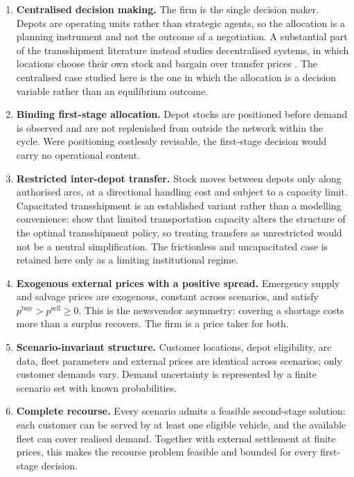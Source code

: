 \documentclass[authoryear,final,3p,times]{elsarticle}
\theoremstyle{definition}
\theoremstyle{plain}
\begin{document}
\begin{enumerate}[label=(A\arabic*),leftmargin=*]
\item \textbf{Centralised decision making.} The firm is the single decision
maker.  Depots are operating units rather than strategic agents, so the
allocation is a planning instrument and not the outcome of a negotiation.  A
substantial part of the transshipment literature instead studies decentralised
systems, in which locations choose their own stock and bargain over transfer
prices \citep{paterson2011lateral}.  The centralised case studied here is the
one in which the allocation is a decision variable rather than an equilibrium
outcome.

\item \textbf{Binding first-stage allocation.} Depot stocks are positioned
before demand is observed and are not replenished from outside the network
within the cycle. Were positioning costlessly revisable, the first-stage
decision would carry no operational content.

\item \textbf{Restricted inter-depot transfer.} Stock moves between depots only
along authorised arcs, at a directional handling cost and subject to a capacity
limit. Capacitated transshipment is an established variant rather than a
modelling convenience: \citet{ozdemir2006capacitated} show that limited
transportation capacity alters the structure of the optimal transshipment
policy, so treating transfers as unrestricted would not be a neutral
simplification. The frictionless and uncapacitated case is retained here only
as a limiting institutional regime.

\item \textbf{Exogenous external prices with a positive spread.} Emergency
supply and salvage prices are exogenous, constant across scenarios, and satisfy
$p^{\mathrm{buy}}>p^{\mathrm{sell}}\ge0$. This is the newsvendor asymmetry:
covering a shortage costs more than a surplus recovers. The firm is a price
taker for both.

\item \textbf{Scenario-invariant structure.} Customer locations, depot
eligibility, arc data, fleet parameters and external prices are identical
across scenarios; only customer demands vary. Demand uncertainty is represented
by a finite scenario set with known probabilities.

\item \textbf{Complete recourse.} Every scenario admits a feasible
second-stage solution: each customer can be served by at least one eligible
vehicle, and the available fleet can cover realised demand. Together with
external settlement at finite prices, this makes the recourse problem feasible
and bounded for every first-stage decision.


\end{enumerate}
\end{document}
